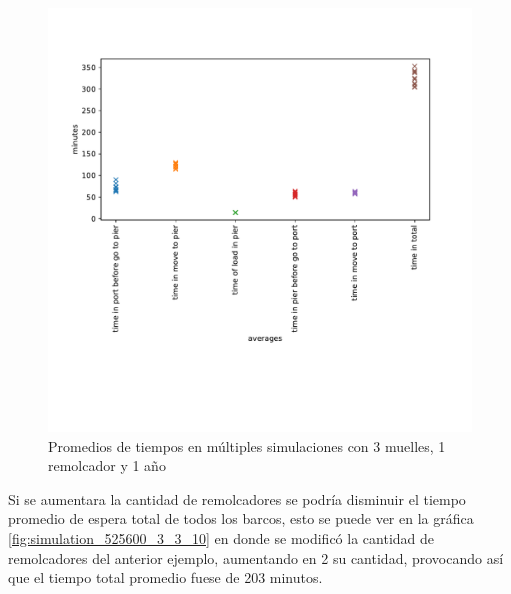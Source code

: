 \documentclass[titlepage,11pt]{scrartcl}
\begin{document}
	\begin{figure}[htb]
		\begin{center}
			\includegraphics[width=\columnwidth]{./figures/simulation_525600_3_1_10.pdf}
		\end{center}
		\caption{Promedios de tiempos en múltiples simulaciones con 3 muelles, 1 remolcador y 1 año \label{fig:simulation_525600_3_1_10}}
	\end{figure}
	
	Si se aumentara la cantidad de remolcadores se podría disminuir el tiempo promedio de espera total de todos los barcos, esto se puede ver en la gráfica \ref{fig:simulation_525600_3_3_10} en donde se modificó la cantidad de remolcadores del anterior ejemplo, aumentando en 2 su cantidad, provocando así que el tiempo total promedio fuese de 203 minutos.
\end{document}
